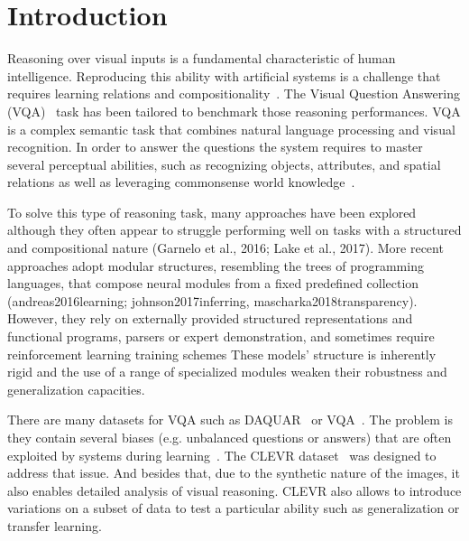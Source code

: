 \section{Introduction}
Reasoning over visual inputs is a fundamental characteristic of human intelligence.
Reproducing this ability with artificial systems is a challenge that requires learning relations and compositionality~\citep{hu2017learning, johnson2017inferring}. The Visual Question Answering (VQA)~\citep{antol2015vqa,malinowski2014towards,wu2017visual} task has been tailored to benchmark those reasoning performances. VQA is a complex semantic task that combines natural language processing and visual recognition.
In order to answer the questions the system  requires to master several perceptual abilities, such as recognizing objects, attributes, and spatial relations as well as leveraging commonsense world knowledge~\citep{hudson2018compositional}.

To solve this type of reasoning task, many approaches have been explored although they often appear to struggle performing well on tasks with a structured and compositional nature (Garnelo et al., 2016; Lake et al., 2017). 
More recent approaches adopt modular structures, resembling the trees of programming languages, that compose neural modules from a fixed predefined collection (andreas2016learning; johnson2017inferring, mascharka2018transparency). However, they rely on externally provided structured representations and functional programs, parsers or expert demonstration, and sometimes require reinforcement learning training schemes
These models’ structure is inherently rigid and the use of a range of specialized modules weaken their robustness and generalization capacities.

There are many datasets for VQA such as DAQUAR~\citep{malinowski2014multi} or VQA~\citep{antol2015vqa}. The problem is they contain several biases (e.g. unbalanced questions or answers) that are often exploited by systems during learning~\citep{goyal2017making}.
The CLEVR dataset~\citep{johnson2017clevr} was designed to address that issue.
And besides that, due to the synthetic nature of the images, it also enables detailed analysis of visual reasoning.
CLEVR also allows to introduce variations on a subset of data to test a particular ability such as generalization or transfer learning.


